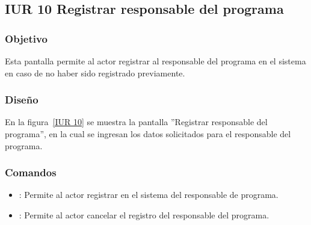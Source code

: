 \subsection{IUR 10 Registrar responsable del programa}

\subsubsection{Objetivo}

	
      Esta pantalla permite al actor  registrar al responsable del programa en el sistema en caso de no haber sido registrado previamente. 
\subsubsection{Diseño}

	En la figura~\ref{IUR 10} se muestra la pantalla ''Registrar responsable del programa'', en la cual se ingresan los datos solicitados para el responsable del programa. 


	
	


\subsubsection{Comandos}
\begin{itemize}
	\item {}: Permite al actor registrar en el sistema del responsable de programa. 
	\item {}: Permite al actor cancelar el registro del responsable del programa.
\end{itemize}


